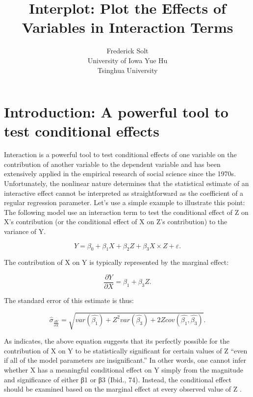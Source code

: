 \documentclass[
  article]{jss}
\author{Frederick Solt\\University of Iowa \And Yue Hu\\Tsinghua
University}
\title{Interplot: Plot the Effects of Variables in Interaction Terms}
\begin{document}
\maketitle
\ifdefined\Shaded\renewenvironment{Shaded}{\begin{tcolorbox}[sharp corners, enhanced, interior hidden, borderline west={3pt}{0pt}{shadecolor}, boxrule=0pt, breakable, frame hidden]}{\end{tcolorbox}}\fi

\hypertarget{sec-introduction-apowerful-tool-to-test-conditional-effects}{%
\section{Introduction: A powerful tool to test conditional
effects}\label{sec-introduction-apowerful-tool-to-test-conditional-effects}}

Interaction is a powerful tool to test conditional effects of one
variable on the contribution of another variable to the dependent
variable and has been extensively applied in the empirical research of
social science since the 1970s\citep{Wright1976}. Unfortunately, the
nonlinear nature determines that the statistical estimate of an
interactive effect cannot be interpreted as straightforward as the
coefficient of a regular regression parameter. Let's use a simple
example to illustrate this point: The following model use an interaction
term to test the conditional effect of Z on X's contribution (or the
conditional effect of X on Z's contribution) to the variance of Y.

\[
Y = \beta_0 + \beta_1X + \beta_2Z + \beta_3X\times Z + \varepsilon.
\]

The contribution of X on Y is typically represented by the marginal
effect:

\[
\frac{\partial Y}{\partial X} = \beta_1 + \beta_3Z.
\]

The standard error of this estimate is thus:

\[
\hat{\sigma}_{\frac{\partial Y}{\partial X}} = \sqrt{var(\hat{\beta_1}) + Z^2var(\hat{\beta_3}) + 2Zcov(\hat{\beta_1}, \hat{\beta_3})}.
\]

As \citet[p.70]{BramborClarkGolder2006} indicates, the above equation
suggests that its perfectly possible for the contribution of X on Y to
be statistically significant for certain values of Z ``even if all of
the model parameters are insignificant.'' In other words, one cannot
infer whether X has a meaningful conditional effect on Y simply from the
magnitude and significance of either β1 or β3 (Ibid., 74). Instead, the
conditional effect should be examined based on the marginal effect at
every observed value of Z
\citep{BerryGolderMilton2012, BramborClarkGolder2006, Braumoeller2004}.
\end{document}
